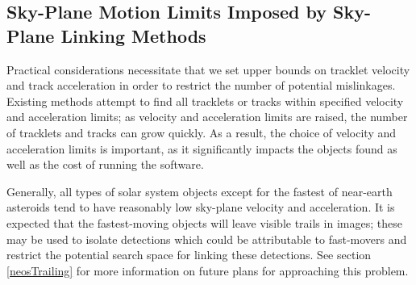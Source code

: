 \subsection{Sky-Plane Motion Limits Imposed by Sky-Plane Linking Methods}

Practical considerations necessitate that we set upper bounds on
tracklet velocity and track acceleration in order to restrict the
number of potential mislinkages. Existing methods attempt to find all
tracklets or tracks within specified velocity and acceleration limits;
as velocity and acceleration limits are raised, the number of
tracklets and tracks can grow quickly.  As a result, the choice of
velocity and acceleration limits is important, as it significantly
impacts the objects found as well as the cost of running the software.

Generally, all types of solar system objects except for the fastest of
near-earth asteroids tend to have reasonably low sky-plane velocity
and acceleration. It is expected that the fastest-moving objects will
leave visible trails in images; these may be used to isolate
detections which could be attributable to fast-movers and restrict the
potential search space for linking these detections.  See section
\ref{neosTrailing} for more information on future plans for
approaching this problem.  

